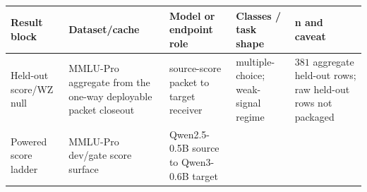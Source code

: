 \documentclass{article}
\begin{document}
\begingroup\small
\begin{longtable}[]{@{}lllll@{}}
\toprule
\begin{minipage}[b]{0.17\columnwidth}\raggedright
Result block\strut
\end{minipage} & \begin{minipage}[b]{0.17\columnwidth}\raggedright
Dataset/cache\strut
\end{minipage} & \begin{minipage}[b]{0.17\columnwidth}\raggedright
Model or endpoint role\strut
\end{minipage} & \begin{minipage}[b]{0.17\columnwidth}\raggedright
Classes / task shape\strut
\end{minipage} & \begin{minipage}[b]{0.17\columnwidth}\raggedright
n and caveat\strut
\end{minipage}\tabularnewline
\midrule
\endhead
\begin{minipage}[t]{0.17\columnwidth}\raggedright
Held-out score/WZ null\strut
\end{minipage} & \begin{minipage}[t]{0.17\columnwidth}\raggedright
MMLU-Pro aggregate from the one-way deployable packet closeout\strut
\end{minipage} & \begin{minipage}[t]{0.17\columnwidth}\raggedright
source-score packet to target receiver\strut
\end{minipage} & \begin{minipage}[t]{0.17\columnwidth}\raggedright
multiple-choice; weak-signal regime\strut
\end{minipage} & \begin{minipage}[t]{0.17\columnwidth}\raggedright
\(381\) aggregate held-out rows; raw held-out rows not
packaged\strut
\end{minipage}\tabularnewline
\begin{minipage}[t]{0.17\columnwidth}\raggedright
Powered score ladder\strut
\end{minipage} & \begin{minipage}[t]{0.17\columnwidth}\raggedright
MMLU-Pro dev/gate score surface\strut
\end{minipage} & \begin{minipage}[t]{0.17\columnwidth}\raggedright
Qwen2.5-0.5B source to Qwen3-0.6B target\strut
\end{minipage} & \begin{minipage}[t]{0.17\columnwidth}\raggedright

\end{minipage}
\end{longtable}
\end{document}
